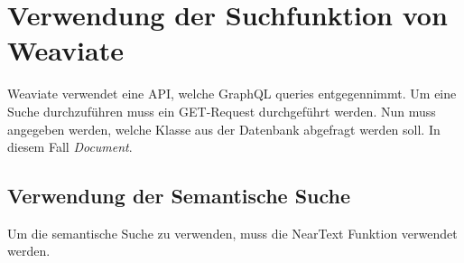 \section{Verwendung der Suchfunktion von Weaviate}
Weaviate verwendet eine API, welche GraphQL queries entgegennimmt.
Um eine Suche durchzuführen muss ein GET-Request durchgeführt werden.
Nun muss angegeben werden, welche Klasse aus der Datenbank abgefragt werden soll.
In diesem Fall \textit{Document}.

\subsection{Verwendung der Semantische Suche}
Um die semantische Suche zu verwenden, muss die NearText Funktion verwendet werden.